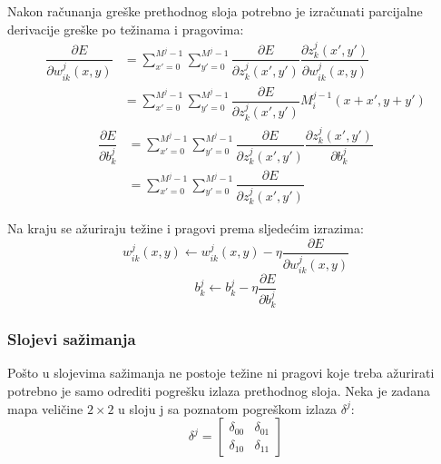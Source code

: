\documentclass[times, utf8, zavrsni, numeric]{fer}
\begin{document}
Nakon računanja greške prethodnog sloja potrebno je izračunati parcijalne derivacije greške po težinama i pragovima:
\begin{equation}\label{eq:conv-sloj-derw}
\begin{split}
\dfrac{\partial E}{\partial w^j_{ik}(x, y)} &= \sum_{x'=0}^{M^j-1} \sum_{y'=0}^{M^j-1} \dfrac{\partial E}{\partial z^j_k (x', y')} \dfrac{\partial z^j_k (x', y')}{\partial w^j_{ik}(x, y)} \\
&= \sum_{x'=0}^{M^j-1} \sum_{y'=0}^{M^j-1} \dfrac{\partial E}{\partial z^j_k (x', y')} M^{j-1}_i (x+x', y+y')
\end{split}
\end{equation}
\begin{equation}\label{eq:conv-sloj-derb}
\begin{split}
\dfrac{\partial E}{\partial b^j_k} &= \sum_{x'=0}^{M^j-1} \sum_{y'=0}^{M^j-1} \dfrac{\partial E}{\partial z^j_k (x', y')} \dfrac{\partial z^j_k (x', y')}{\partial b^j_k} \\
&= \sum_{x'=0}^{M^j-1} \sum_{y'=0}^{M^j-1} \dfrac{\partial E}{\partial z^j_k (x', y')}
\end{split}
\end{equation}

Na kraju se ažuriraju težine i pragovi prema sljedećim izrazima:
\begin{equation}\label{eq:conv-azuriraj-w}
w^j_{ik}(x, y) \leftarrow w^j_{ik}(x, y) - \eta\dfrac{\partial E}{\partial w^j_{ik}(x, y)}
\end{equation}
\begin{equation}\label{eq:conv-azuriraj-b}
b^j_k \leftarrow b^j_k - \eta\dfrac{\partial E}{\partial b^j_k}
\end{equation}

\subsubsection{Slojevi sažimanja}
Pošto u slojevima sažimanja ne postoje težine ni pragovi koje treba ažurirati potrebno je samo odrediti pogrešku izlaza prethodnog sloja. Neka je zadana mapa veličine $2 \times 2$ u sloju j sa poznatom pogreškom izlaza $\delta^j$:
\begin{equation}
\delta^j = \left[
\begin{matrix}
\delta_{00} & \delta_{01} \\
\delta_{10} & \delta_{11}
\end{matrix}
\right]
\end{equation}
\end{document}

